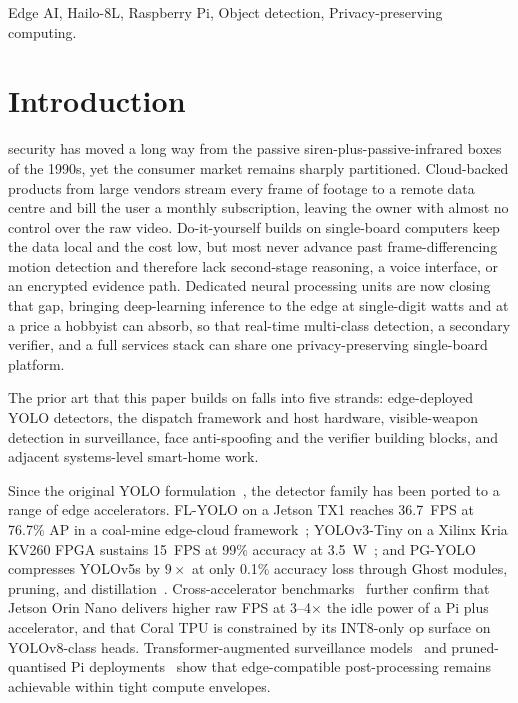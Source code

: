 \documentclass{ieeeaccess}
\begin{document}
\begin{keywords}
Edge AI, Hailo-8L, Raspberry Pi, Object detection, Privacy-preserving computing.
\end{keywords}

\titlepgskip=-21pt

\maketitle

\section{Introduction}
\label{sec:introduction}
 security has moved a long way from the passive siren-plus-passive-infrared boxes of the 1990s, yet the consumer market remains sharply partitioned. Cloud-backed products from large vendors stream every frame of footage to a remote data centre and bill the user a monthly subscription, leaving the owner with almost no control over the raw video. Do-it-yourself builds on single-board computers keep the data local and the cost low, but most never advance past frame-differencing motion detection and therefore lack second-stage reasoning, a voice interface, or an encrypted evidence path. Dedicated neural processing units are now closing that gap, bringing deep-learning inference to the edge at single-digit watts and at a price a hobbyist can absorb, so that real-time multi-class detection, a secondary verifier, and a full services stack can share one privacy-preserving single-board platform.

The prior art that this paper builds on falls into five strands: edge-deployed YOLO detectors, the dispatch framework and host hardware, visible-weapon detection in surveillance, face anti-spoofing and the verifier building blocks, and adjacent systems-level smart-home work.

Since the original YOLO formulation~\cite{b2}, the detector family has been ported to a range of edge accelerators. FL-YOLO on a Jetson TX1 reaches 36.7~FPS at 76.7\% AP in a coal-mine edge-cloud framework~\cite{b1}; YOLOv3-Tiny on a Xilinx Kria KV260 FPGA sustains 15~FPS at 99\% accuracy at 3.5~W~\cite{b5}; and PG-YOLO compresses YOLOv5s by $9\times$ at only 0.1\% accuracy loss through Ghost modules, pruning, and distillation~\cite{b6}. Cross-accelerator benchmarks~\cite{b25,b26} further confirm that Jetson Orin Nano delivers higher raw FPS at 3--4$\times$ the idle power of a Pi plus accelerator, and that Coral TPU is constrained by its INT8-only op surface on YOLOv8-class heads. Transformer-augmented surveillance models~\cite{b27} and pruned-quantised Pi deployments~\cite{b29} show that edge-compatible post-processing remains achievable within tight compute envelopes.
\end{document}
